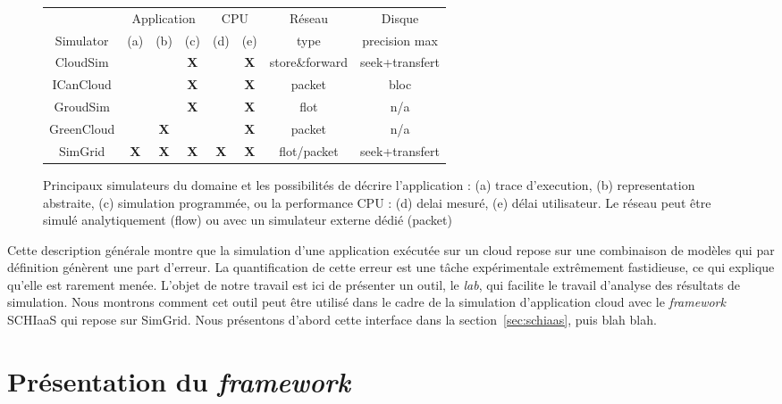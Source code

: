 \documentclass[parallelisme]{compas2017}
\begin{document}
\begin{figure}[hbt]
\begin{tabular}{|c||c|c|c||c|c|c|c|}
	\hline
	& \multicolumn{3}{c|}{Application} &
	\multicolumn{2}{c|}{CPU}&Réseau&Disque\\
	\cline{2-8}
	Simulator &(a) 
                  &(b)
                  &(c)
                  &(d)
                  &(e)&
	type & precision max\\
	\hline
	CloudSim\cite{cloudsim} & & & \bf X &&\bf
	X&store\&forward&seek+transfert\\ \hline
	ICanCloud\cite{icancloud} & & & \bf X &&\bf X&packet& bloc \\ \hline
	GroudSim\cite{groudsim} & & & \bf X &&\bf X&flot& n/a\\\hline
	GreenCloud\cite{greencloud} & & \bf X &&&\bf X&packet& n/a\\ \hline
	SimGrid\cite{simgrid}& \bf X & \bf X & \bf X &\bf X&\bf X& flot/packet &
	seek+transfert \\
	\hline
\end{tabular}
\caption{Principaux simulateurs du domaine et les possibilités de décrire
  l'application : (a) trace d'execution, (b) representation abstraite, (c) simulation
  programmée, ou la performance CPU : (d) delai mesuré, (e) délai
  utilisateur. Le réseau peut être simulé analytiquement (flow) ou avec un
  simulateur externe dédié (packet)}
\label{fig:sim-features}
\end{figure}

Cette description générale montre que la simulation d'une application exécutée
sur un cloud repose sur une combinaison de modèles qui par définition génèrent
une part d'erreur. La quantification de cette erreur est une tâche expérimentale
extrêmement fastidieuse, ce qui explique qu'elle est rarement menée. L'objet
de notre travail est ici de présenter un outil, le \emph{lab}, qui facilite
le travail d'analyse des résultats de simulation. Nous montrons comment cet 
outil peut être utilisé dans le cadre de la simulation d'application cloud
avec le \textit{framework} SCHIaaS qui repose sur SimGrid. Nous présentons 
d'abord cette interface dans la section~\ref{sec:schiaas}, puis blah blah.





\section{Présentation du \textit{framework}}
\end{document}
